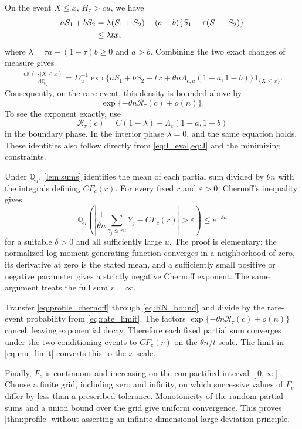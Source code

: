 \documentclass[11pt,letterpaper]{article}
\numberwithin{equation}{section}
\theoremstyle{definition}
\theoremstyle{remark}
\newcommand{\PP}{\mathbb P}
\newcommand{\QQ}{\mathbb Q}
\newcommand{\dd}{\,\mathrm d}
\newcommand{\ind}{\mathbf 1}
\newcommand{\rate}{\mathcal R_\tau}
\begin{document}
On the event $X\le x$, $H_\tau>cu$, we have
\begin{align}\label{eq:key_bound}
 aS_1+bS_2
 &=\lambda(S_1+S_2)
 +(a-b)\{S_1-\tau(S_1+S_2)\}\notag\\
 &\le\lambda tx,
\end{align}
where $\lambda=\tau a+(1-\tau)b\ge0$ and $a>b$. Combining the two exact changes of measure gives
\begin{align}\label{eq:profileRN}
 \frac{\dd\PP(\,\cdot\mid X\le x)}{\dd\QQ_u}
 =D_u^{-1}\exp\{aS_1+bS_2-tx
 +\theta n\Lambda_{c,u}(1-a,1-b)\}
 \ind_{\{X\le x\}}.
\end{align}
Consequently, on the rare event, this density is bounded above by
\begin{equation}\label{eq:RN_bound}
 \exp\{-\theta n\rate(c)+o(n)\}.
\end{equation}
To see the exponent exactly, use
\[
 \rate(c)=C(1-\lambda)-\Lambda_c(1-a,1-b)
\]
in the boundary phase. In the interior phase $\lambda=0$, and the same equation holds. These identities also follow directly from \cref{eq:I_eval,eq:J} and the minimizing constraints.

Under $\QQ_u$, \cref{lem:sums} identifies the mean of each partial sum divided by $\theta n$ with the integrals defining $CF_c(r)$. For every fixed $r$ and $\varepsilon>0$, Chernoff's inequality gives
\begin{equation}\label{eq:profile_chernoff}
 \QQ_u\left(\left|
 \frac1{\theta n}\sum_{\gamma_j\le ru}Y_j-CF_c(r)
 \right|>\varepsilon\right)\le e^{-\delta n}
\end{equation}
for a suitable $\delta>0$ and all sufficiently large $u$. The proof is elementary: the normalized log moment generating function converges in a neighborhood of zero, its derivative at zero is the stated mean, and a sufficiently small positive or negative parameter gives a strictly negative Chernoff exponent. The same argument treats the full sum $r=\infty$.

Transfer \cref{eq:profile_chernoff} through \cref{eq:RN_bound} and divide by the rare-event probability from \cref{eq:rate_limit}. The factors $\exp\{-\theta n\rate(c)+o(n)\}$ cancel, leaving exponential decay. Therefore each fixed partial sum converges under the two conditioning events to $CF_c(r)$ on the $\theta n/t$ scale. The limit in \cref{eq:mu_limit} converts this to the $x$ scale.

Finally, $F_c$ is continuous and increasing on the compactified interval $[0,\infty]$. Choose a finite grid, including zero and infinity, on which successive values of $F_c$ differ by less than a prescribed tolerance. Monotonicity of the random partial sums and a union bound over the grid give uniform convergence. This proves \cref{thm:profile} without asserting an infinite-dimensional large-deviation principle.
\end{document}
